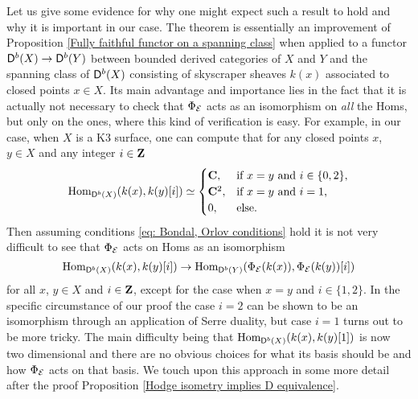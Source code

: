 Let us give some evidence for why one might expect such a result to hold and why it is important in our case. The theorem is essentially an improvement of Proposition \ref{Fully faithful functor on a spanning class} when applied to a functor $\mathsf{D}^b(X) \to \mathsf{D}^b(Y)$ between bounded derived categories of $X$ and $Y$ and the spanning class of $\mathsf{D}^b(X)$ consisting of skyscraper sheaves $k(x)$ associated to closed points $x \in X$. Its main advantage and importance lies in the fact that it is actually not necessary 
to check that $\Phi_{\mathcal E}$ acts as an isomorphism on \emph{all} the Homs, but only on the ones, where this kind of verification is easy. For example, in our case, when $X$ is a K3 surface, one can compute that 
for any closed points $x$, $y \in X$ and any integer $i \in \mathbf Z$
\begin{equation}
        \operatorname{Hom}_{\mathsf{D}^b(X)}(k(x), k(y)[i]) \simeq \begin{cases}
            \mathbf C, &\text{if $x = y$ and $i \in \{0, 2\}$,} \\
            \mathbf C^2, &\text{if $x = y$ and $i = 1$,} \\
            0, &\text{else.}
        \end{cases}
\end{equation}
Then assuming conditions \eqref{eq: Bondal, Orlov conditions} hold it is not very difficult to see that $\Phi_{\mathcal E}$ acts on Homs as an isomorphism
\[
    \operatorname{Hom}_{\mathsf{D}^b(X)}(k(x), k(y)[i]) \to  \operatorname{Hom}_{\mathsf{D}^b(Y)}(\Phi_{\mathcal E}(k(x)), \Phi_{\mathcal E}(k(y))[i])
\] 
for all $x$, $y \in X$ and $i \in \mathbf Z$, except for the case when $x = y$ and $i \in \{1,2\}$. In the specific circumstance of our proof the case $i = 2$ can be shown to be an isomorphism through an application of Serre duality, but case $i = 1$ turns out to be more tricky. The main difficulty being that $\operatorname{Hom}_{\mathsf{D}^b(X)}(k(x), k(y)[1])$ is now two dimensional and there are no obvious choices for what its basis should be and how $\Phi_{\mathcal E}$ acts on that basis. We touch upon this approach in some more detail after the proof Proposition \ref{Hodge isometry implies D equivalence}. 

\vspace{0.3cm}

